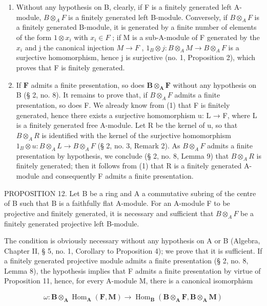 \begin{enumerate}
\def\labelenumi{(\arabic{enumi})}
\item
  Without any hypothesis on B, clearly, if F is a finitely generated left A-module, \(B \otimes_{A} F\) is a finitely generated left B-module. Conversely, if \(B \otimes_{A} F\) is a finitely generated B-module, it is generated by a finite number of elements of the form \(1 \otimes x_{i}\) with \(x_{i} \in F\) ; if M is a sub-A-module of F generated by the \(x_{i}\) and j the canonical injection \(M \to F\) , \(1_{B} \otimes j: B \otimes_{A} M \to B \otimes_{A} F\) is a surjective homomorphism, hence j is surjective (no. 1, Proposition 2), which proves that F is finitely generated.
\item
  If \(\mathbf{F}\) admits a finite presentation, so does \(\mathbf{B} \otimes_{\mathbf{A}} \mathbf{F}\) without any hypothesis on B (§ 2, no. 8). It remains to prove that, if \(B \otimes_{A} F\) admits a finite presentation, so does F. We already know from (1) that F is finitely generated, hence there exists a surjective homomorphism u: L → F, where L is a finitely generated free A-module. Let R be the kernel of u, so that \(B \otimes_{A} R\) is identified with the kernel of the surjective homomorphism \(1_{B} \otimes u: B \otimes_{A} L \to B \otimes_{A} F\) (§ 2, no. 3, Remark 2). As \(B \otimes_{A} F\) admits a finite presentation by hypothesis, we conclude (§ 2, no. 8, Lemma 9) that \(B \otimes_{A} R\) is finitely generated; then it follows from (1) that R is a finitely generated A-module and consequently F admits a finite presentation.
\end{enumerate}

PROPOSITION 12. Let B be a ring and A a commutative subring of the centre of B such that B is a faithfully flat A-module. For an A-module F to be projective and finitely generated, it is necessary and sufficient that \(B \otimes_{A} F\) be a finitely generated projective left B-module.

The condition is obviously necessary without any hypothesis on A or B (Algebra, Chapter II, § 5, no. 1, Corollary to Proposition 4); we prove that it is sufficient. If a finitely generated projective module admits a finite presentation (§ 2, no. 8, Lemma 8), the hypothesis implies that F admits a finite presentation by virtue of Proposition 11, hence, for every A-module M, there is a canonical isomorphism

\[
\omega : \mathbf {B} \otimes_ {\mathbf {A}} \operatorname{Hom} _ {\mathbf {A}} (\mathbf {F}, \mathbf {M}) \rightarrow \operatorname{Hom} _ {\mathbf {B}} (\mathbf {B} \otimes_ {\mathbf {A}} \mathbf {F}, \mathbf {B} \otimes_ {\mathbf {A}} \mathbf {M})
\]

